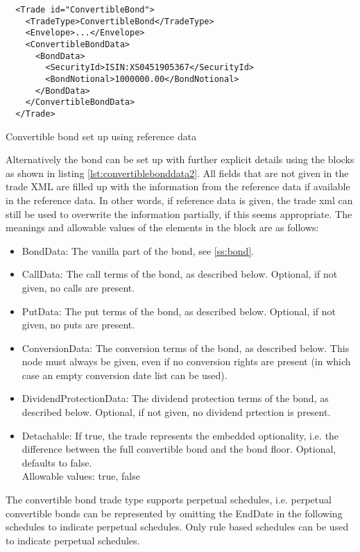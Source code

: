 \begin{listing}[H]
\begin{verbatim}
  <Trade id="ConvertibleBond">
    <TradeType>ConvertibleBond</TradeType>
    <Envelope>...</Envelope>
    <ConvertibleBondData>
      <BondData>
        <SecurityId>ISIN:XS0451905367</SecurityId>
        <BondNotional>1000000.00</BondNotional>
      </BondData>
    </ConvertibleBondData>
  </Trade>
\end{verbatim}
\caption{Convertible bond set up using reference data}
\label{lst:convertiblebonddata1}
\end{listing}

Alternatively the bond can be set up with further explicit details using the blocks as shown in listing
\ref{lst:convertiblebonddata2}. All fields that are not given in the trade XML are filled up with the information from
the reference data if available in the reference data. In other words, if reference data is given, the trade xml can
still be used to overwrite the information partially, if this seems appropriate. The meanings and allowable values of
the elements in the block are as follows:

\begin{itemize}
  \item BondData: The vanilla part of the bond, see \ref{ss:bond}.
  \item CallData: The call terms of the bond, as described below. Optional, if not given, no calls are present.
  \item PutData: The put terms of the bond, as described below. Optional, if not given, no puts are present.
  \item ConversionData: The conversion terms of the bond, as described below. This node must always be given, even if no
    conversion rights are present (in which case an empty conversion date list can be used).
  \item DividendProtectionData: The dividend protection terms of the bond, as described below. Optional, if not given,
    no dividend prtection is present.
  \item Detachable: If true, the trade represents the embedded optionality, i.e. the difference between the full
    convertible bond and the bond floor. Optional, defaults to false. \\
    Allowable values: true, false
\end{itemize}

The convertible bond trade type supports perpetual schedules, i.e. perpetual convertible bonds can be represented by
omitting the EndDate in the following schedules to indicate perpetual schedules. Only rule based schedules can be used
to indicate perpetual schedules.

